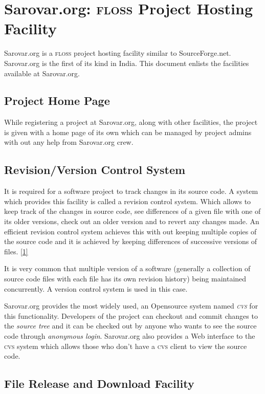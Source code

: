 \documentclass{article}
\begin{document}
\section{Sarovar.org: \textsc{floss} Project Hosting Facility}
Sarovar.org is a \textsc{floss} project hosting facility similar to
SourceForge.net. Sarovar.org is the first of its kind in India. This
document enlists the facilities available at Sarovar.org.

\subsection{Project Home Page}
While registering a project at Sarovar.org, along with other
facilities, the project is given with a home page of its own which can
be managed by project admins with out any help from Sarovar.org crew.

\subsection{Revision/Version Control System}

It is required for a software project to track changes in its source
code. A system which provides this facility is called a revision
control system. Which allows to keep track of the changes in source
code, see differences of a given file with one of its older versions,
check out an older version and to revert any changes made. An
efficient revision control system achieves this with out keeping
multiple copies of the source code and it is achieved by keeping
differences of successive versions of files. \ref{1}

It is very common that multiple version of a software (generally a
collection of source code files with each file has its own revision
history) being maintained concurrently. A version control system is
used in this case.

Sarovar.org provides the most widely used, an Opensource system named
{\em \textsc{cvs}} for this functionality. Developers of the project
can checkout and commit changes to the {\em source tree} and it can be
checked out by anyone who wants to see the source code through {\em
  anonymous login}. Sarovar.org also provides a Web interface to the
\textsc{cvs} system which allows those who don't have a \textsc{cvs}
client to view the source code.

\subsection{File Release and Download Facility}
\end{document}
